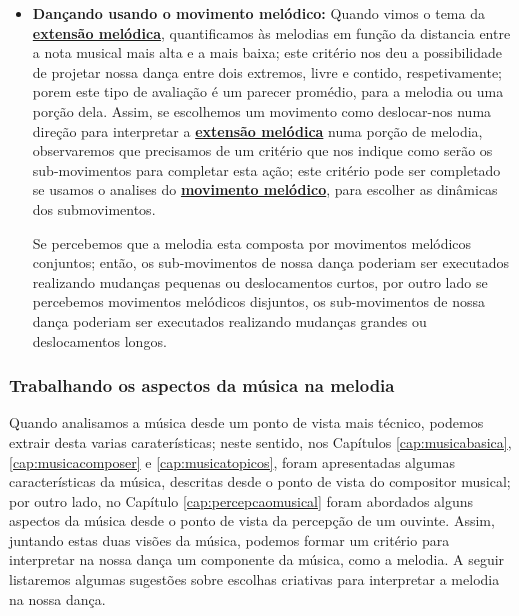\begin{itemize}
\item \textbf{Dançando usando o movimento melódico:}
Quando vimos o tema da \hyperref[ref:melodica:range]{\textbf{extensão melódica}},
quantificamos às melodias em função da distancia entre a nota musical mais alta e a mais baixa;
este critério nos deu a possibilidade de projetar nossa dança entre dois extremos,
livre e contido, respetivamente;
porem este tipo de avaliação é um parecer promédio,
para a melodia ou uma porção dela. 
Assim, se escolhemos um movimento como deslocar-nos numa direção 
para interpretar a \hyperref[ref:melodica:range]{\textbf{extensão melódica}} numa porção de melodia,
observaremos que precisamos de um critério que nos indique como serão os sub-movimentos para completar esta ação;
este critério pode ser completado se usamos o analises do \hyperref[ref:melodica:movimento]{\textbf{movimento melódico}},
para escolher as dinâmicas dos submovimentos.
\begin{example}
Se percebemos que a melodia esta composta por movimentos melódicos conjuntos;
então, 
os sub-movimentos de nossa dança poderiam ser executados realizando mudanças pequenas ou deslocamentos curtos,
por outro lado se percebemos movimentos melódicos disjuntos,
os sub-movimentos de nossa dança poderiam ser executados realizando mudanças grandes ou deslocamentos longos.
\end{example}
\end{itemize}


\subsubsection{Trabalhando os aspectos da música na melodia} 
Quando analisamos a música desde um ponto de vista mais técnico, 
podemos extrair desta varias caraterísticas; 
neste sentido, nos Capítulos \ref{cap:musicabasica},
\ref{cap:musicacomposer} e \ref{cap:musicatopicos},
foram apresentadas algumas características da música, 
descritas desde o ponto de vista do compositor musical;
por outro lado, no Capítulo \ref{cap:percepcaomusical} 
foram abordados alguns aspectos da música desde o ponto de vista da percepção de um ouvinte.
Assim, juntando estas duas visões da música,
podemos formar um critério para interpretar  na nossa dança um componente da música, como a melodia.
A seguir listaremos algumas sugestões sobre escolhas criativas para interpretar a melodia na nossa dança.


